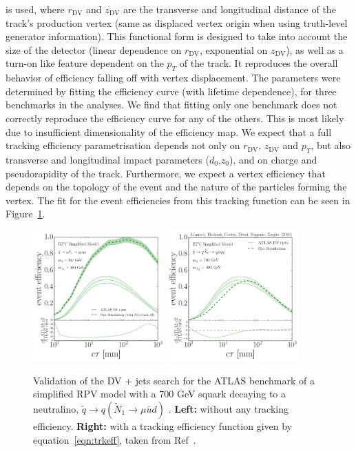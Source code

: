 is used, where $r_\mathrm{DV}$ and $z_\mathrm{DV}$ are the transverse and longitudinal distance of the track's production vertex (same as displaced vertex origin when using truth-level generator information).  This functional form is designed to take into account the size of the detector (linear dependence on $r_\mathrm{DV}$, exponential on $z_\mathrm{DV}$), as well as a turn-on like feature dependent on the $p_{T}$ of the track. It reproduces the overall behavior of efficiency falling off with vertex displacement. The parameters were determined by fitting the efficiency curve (with lifetime dependence), for three benchmarks in the analyses.  We find that fitting only one benchmark does not correctly reproduce the efficiency curve for any of the others.  This is most likely due to insufficient dimensionality of the efficiency map.  We expect that a full tracking efficiency parametrisation depends not only on $r_\mathrm{DV}$, $z_\mathrm{DV}$ and $p_T$, but also transverse and longitudinal impact parameters ($d_0$,$z_0$), and on charge and pseudorapidity of the track. Furthermore, we expect a vertex efficiency that depends on the topology of the event and the nature of the particles forming the vertex. The fit for the event efficiencies from this tracking function can be seen in Figure~\ref{fig:trkeff}.

\begin{figure}[h]
\begin{center}
\includegraphics[width=0.45\textwidth,angle=0]{ch5-figures/effVsCtau_RPVValidation_NoTrkEff.pdf}
\includegraphics[width=0.45\textwidth,angle=0]{ch5-figures/effVsCtau_RPVValidation.pdf}
\end{center}
\caption{Validation of the DV + jets search for the ATLAS benchmark of a simplified RPV model
  with a 700 GeV squark decaying to a neutralino, $\tilde q \rightarrow q (\tilde N_{1} \rightarrow \mu \bar u d)$ \label{fig:trkeff}. {\bf{Left:}} without any tracking efficiency. {\bf{Right:}} with a tracking efficiency function given by equation~\ref{eqn:trkeff}, taken from Ref~\cite{Allanach:2016pam}.}
\end{figure}

